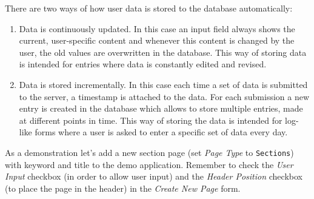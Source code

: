 \documentclass[a4paper,oneside]{book}
\begin{document}
There are two ways of how user data is stored to the database automatically:
\begin{enumerate}
    \item Data is continuously updated.
        In this case an input field always shows the current, user-specific content and whenever this content is changed by the user, the old values are overwritten in the database.
        This way of storing data is intended for entries where data is constantly edited and revised.
    \item Data is stored incrementally.
        In this case each time a set of data is submitted to the server, a timestamp is attached to the data.
        For each submission a new entry is created in the database which allows to store multiple entries, made at different points in time.
        This way of storing the data is intended for log-like forms where a user is asked to enter a specific set of data every day.
\end{enumerate}

As a demonstration let's add a new section page (set \emph{Page Type} to \texttt{Sections}) with keyword  and title  to the demo application.
Remember to check the \emph{User Input} checkbox (in order to allow user input) and the \emph{Header Position} checkbox (to place the page in the header) in the \emph{Create New Page} form.
\end{document}
